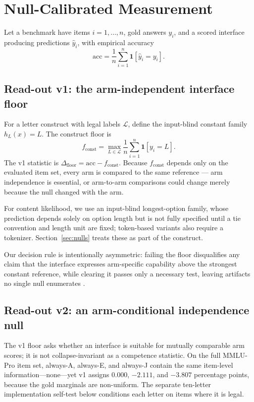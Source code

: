 \section{Null-Calibrated Measurement}

Let a benchmark have items $i=1,\ldots,n$, gold answers $y_{i}$, and a scored interface producing predictions $\hat{y}_{i}$, with empirical accuracy
\begin{equation}
    \mathrm{acc}=\frac{1}{n}\sum_{i=1}^{n}\mathbf{1}[\hat{y}_{i}=y_{i}].
\end{equation}

\subsection{Read-out v1: the arm-independent interface floor}

For a letter construct with legal labels $\mathcal{L}$, define the input-blind constant family $h_{L}(x)=L$. The construct floor is
\begin{equation}
    f_{\mathrm{const}}=\max_{L\in\mathcal{L}}\frac{1}{n}\sum_{i=1}^{n}\mathbf{1}[y_{i}=L].
\end{equation}
The v1 statistic is $\Delta_{\mathrm{floor}}=\mathrm{acc}-f_{\mathrm{const}}$. Because $f_{\mathrm{const}}$ depends only on the evaluated item set, every arm is compared to the same reference --- arm independence is essential, or arm-to-arm comparisons could change merely because the null changed with the arm.

For content likelihood, we use an input-blind longest-option family, whose prediction depends solely on option length but is not fully specified until a tie convention and length unit are fixed; token-based variants also require a tokenizer. Section~\ref{sec:nulls} treats these as part of the construct.

Our decision rule is intentionally asymmetric: failing the floor disqualifies any claim that the interface expresses arm-specific capability above the strongest constant reference, while clearing it passes only a necessary test, leaving artifacts no single null enumerates \citep{feng2019misleading}.

\subsection{Read-out v2: an arm-conditional independence null}
\label{sec:v2}

The v1 floor asks whether an interface is suitable for mutually comparable arm scores; it is not collapse-invariant as a competence statistic. On the full MMLU-Pro item set, always-A, always-E, and always-J contain the same item-level information---none---yet v1 assigns 0.000, $-2.111$, and $-3.807$ percentage points, because the gold marginals are non-uniform. The separate ten-letter implementation self-test below conditions each letter on items where it is legal.

